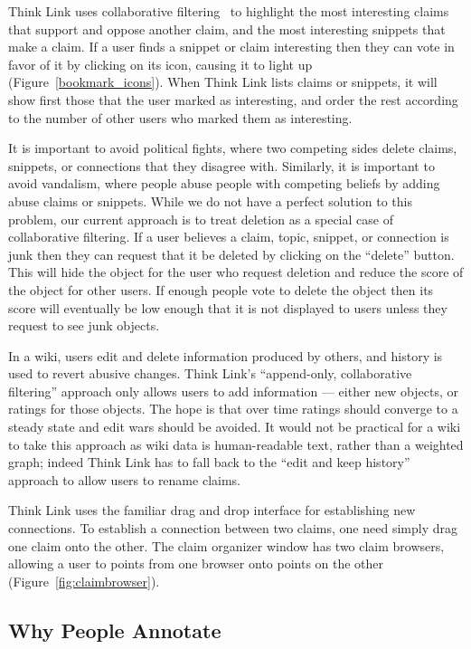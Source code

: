 \documentclass{chi2009}
\begin{document}
Think Link uses collaborative filtering~\cite{collective} to highlight the most interesting claims that support and oppose another claim, and the most interesting snippets that make a claim. If a user finds a snippet or claim interesting then they can vote in favor of it by clicking on its icon, causing it to light up (Figure~\ref{bookmark_icons}). When Think Link lists claims or snippets, it will show first those that the user marked as interesting, and order the rest according to the number of other users who marked them as interesting.

It is important to avoid political fights, where two competing sides delete claims, snippets, or connections that they disagree with. Similarly, it is important to avoid vandalism, where people abuse people with competing beliefs by adding abuse claims or snippets. While we do not have a perfect solution to this problem, our current approach is to treat deletion as a special case of collaborative filtering. If a user believes a claim, topic, snippet, or connection is junk then they can request that it be deleted by clicking on the ``delete'' button. This will hide the object for the user who request deletion and reduce the score of the object for other users. If enough people vote to delete the object then its score will eventually be low enough that it is not displayed to users unless they request to see junk objects. 

In a wiki, users edit and delete information produced by others, and history is used to revert abusive changes. Think Link's ``append-only, collaborative filtering'' approach only allows users to add information --- either new objects, or ratings for those objects. The hope is that over time ratings should converge to a steady state and edit wars should be avoided. It would not be practical for a wiki to take this approach as wiki data is human-readable text, rather than a weighted graph; indeed Think Link has to fall back to the ``edit and keep history'' approach to allow users to rename claims.

Think Link uses the familiar drag and drop interface for establishing new connections. To establish a connection between two claims, one need simply drag one claim onto the other. The claim organizer window has two claim browsers, allowing a user to points from one browser onto points on the other (Figure~\ref{fig:claimbrowser}).


\subsection{Why People Annotate}
\end{document}
